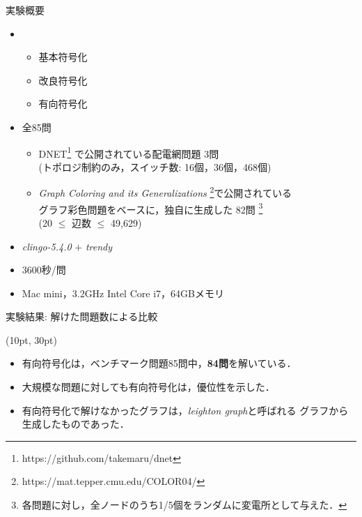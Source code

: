 \begin{frame}{実験概要}
  \renewcommand{\thefootnote}{\fnsymbol{footnote}}
  \setcounter{footnote}{1}
  \begin{itemize}
  \item {}
    \begin{itemize}
     \item 基本符号化
     \item 改良符号化
     \item 有向符号化
    \end{itemize}
  \item {} 全85問
    \begin{itemize}
    \item DNET\footnote{https://github.com/takemaru/dnet}%
      で公開されている配電網問題 3問 \\ (トポロジ制約のみ，スイッチ数:
      16個，36個，468個)
    \item \textit{Graph Coloring and its Generalizations}
      \footnote{https://mat.tepper.cmu.edu/COLOR04/}で公開されている \\
      グラフ彩色問題をベースに，独自に生成した 82問 
      \footnote{各問題に対し，全ノードのうち1/5個をランダムに変電所として与えた．}\\
      (20 $\leq$ 辺数 $\leq$ 49,629)
    \end{itemize}
  \item {} \textit{clingo-5.4.0} $+$ \textit{trendy}
  \item {} 3600秒/問
  \item {} Mac mini，3.2GHz Intel Core i7，64GBメモリ
  \end{itemize}
\end{frame}
\begin{frame}{実験結果: 解けた問題数による比較}
 
\begin{textblock*}{\linewidth}(10pt, 30pt)
\begin{table}[t]
 
\end{table}\vfill

\begin{itemize}
 \item 有向符号化は，ベンチマーク問題85問中，\textbf{84問}を解いている．
 \item 大規模な問題に対しても有向符号化は，優位性を示した．
 \item 有向符号化で解けなかったグラフは，\textit{leighton graph}と呼ばれる
       グラフから生成したものであった．
\end{itemize}\vfill
\end{textblock*}
\end{frame}
